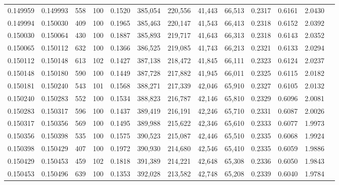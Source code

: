 \begin{tabular}{rrrrrrrrrrrrr}
0.149959 & 0.149993 &   558 & 100 &                                     0.1520 & 385,054 & 220,556 &  41,443 &  66,513 & 0.2317 & 0.6161 & 2.0430 \\
0.149994 & 0.150030 &   409 & 100 &                                     0.1965 & 385,463 & 220,147 &  41,543 &  66,413 & 0.2318 & 0.6152 & 2.0392 \\
0.150030 & 0.150064 &   430 & 100 &                                     0.1887 & 385,893 & 219,717 &  41,643 &  66,313 & 0.2318 & 0.6143 & 2.0352 \\
0.150065 & 0.150112 &   632 & 100 &                                     0.1366 & 386,525 & 219,085 &  41,743 &  66,213 & 0.2321 & 0.6133 & 2.0294 \\
0.150112 & 0.150148 &   613 & 102 &                                     0.1427 & 387,138 & 218,472 &  41,845 &  66,111 & 0.2323 & 0.6124 & 2.0237 \\
0.150148 & 0.150180 &   590 & 100 &                                     0.1449 & 387,728 & 217,882 &  41,945 &  66,011 & 0.2325 & 0.6115 & 2.0182 \\
0.150181 & 0.150240 &   543 & 101 &                                     0.1568 & 388,271 & 217,339 &  42,046 &  65,910 & 0.2327 & 0.6105 & 2.0132 \\
0.150240 & 0.150283 &   552 & 100 &                                     0.1534 & 388,823 & 216,787 &  42,146 &  65,810 & 0.2329 & 0.6096 & 2.0081 \\
0.150283 & 0.150317 &   596 & 100 &                                     0.1437 & 389,419 & 216,191 &  42,246 &  65,710 & 0.2331 & 0.6087 & 2.0026 \\
0.150317 & 0.150356 &   569 & 100 &                                     0.1495 & 389,988 & 215,622 &  42,346 &  65,610 & 0.2333 & 0.6077 & 1.9973 \\
0.150356 & 0.150398 &   535 & 100 &                                     0.1575 & 390,523 & 215,087 &  42,446 &  65,510 & 0.2335 & 0.6068 & 1.9924 \\
0.150398 & 0.150429 &   407 & 100 &                                     0.1972 & 390,930 & 214,680 &  42,546 &  65,410 & 0.2335 & 0.6059 & 1.9886 \\
0.150429 & 0.150453 &   459 & 102 &                                     0.1818 & 391,389 & 214,221 &  42,648 &  65,308 & 0.2336 & 0.6050 & 1.9843 \\
0.150453 & 0.150496 &   639 & 100 &                                     0.1353 & 392,028 & 213,582 &  42,748 &  65,208 & 0.2339 & 0.6040 & 1.9784 \\

\end{tabular}
